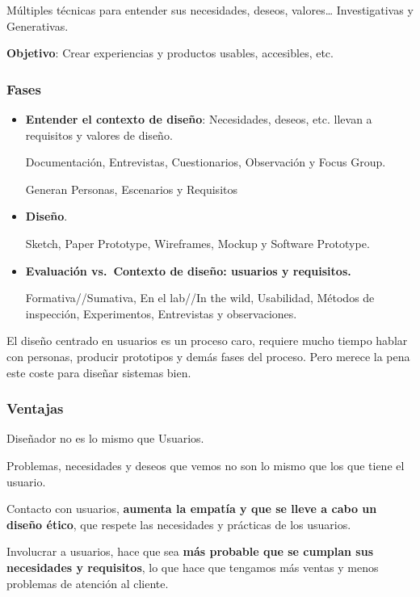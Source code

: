 \documentclass[12pt]{report} %
\begin{document}
Múltiples técnicas para entender sus necesidades, deseos,
valores\ldots{} Investigativas y Generativas.

\textbf{Objetivo}: Crear experiencias y productos usables, accesibles,
etc.

\hypertarget{fases}{%
\subsubsection{Fases}\label{fases}}

\begin{itemize}
\item
  \textbf{Entender el contexto de diseño}: Necesidades, deseos, etc.
  llevan a requisitos y valores de diseño.

  Documentación, Entrevistas, Cuestionarios, Observación y Focus Group.

  Generan Personas, Escenarios y Requisitos
\item
  \textbf{Diseño}.

  Sketch, Paper Prototype, Wireframes, Mockup y Software Prototype.
\item
  \textbf{Evaluación vs.~Contexto de diseño: usuarios y requisitos.}

  Formativa//Sumativa, En el lab//In the wild, Usabilidad, Métodos de
  inspección, Experimentos, Entrevistas y observaciones.
\end{itemize}

El diseño centrado en usuarios es un proceso caro, requiere mucho tiempo
hablar con personas, producir prototipos y demás fases del proceso. Pero
merece la pena este coste para diseñar sistemas bien.

\hypertarget{ventajas}{%
\subsubsection{Ventajas}\label{ventajas}}

Diseñador no es lo mismo que Usuarios.

Problemas, necesidades y deseos que vemos no son lo mismo que los que
tiene el usuario.

Contacto con usuarios, \textbf{aumenta la empatía y que se lleve a cabo
un diseño ético}, que respete las necesidades y prácticas de los
usuarios.

Involucrar a usuarios, hace que sea \textbf{más probable que se cumplan
sus necesidades y requisitos}, lo que hace que tengamos más ventas y
menos problemas de atención al cliente.
\end{document}
